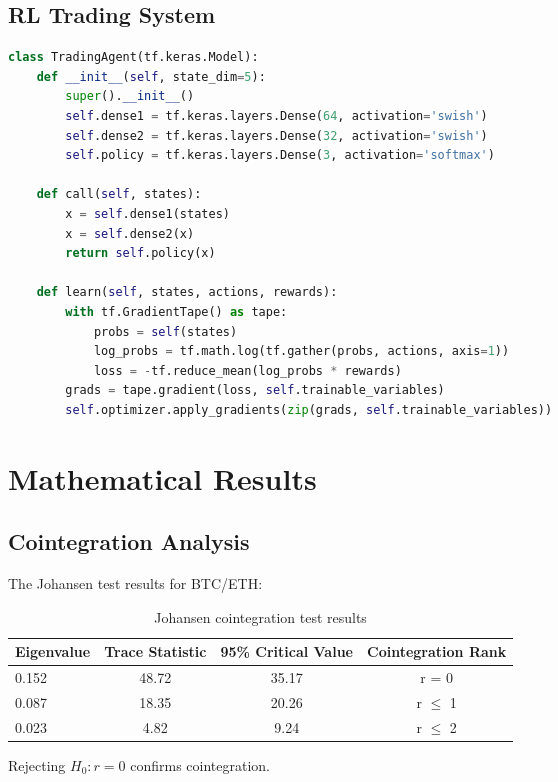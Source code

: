 \documentclass[12pt]{article}
\begin{document}
\subsection{RL Trading System}
\begin{lstlisting}[language=Python, basicstyle=\small\ttfamily]
class TradingAgent(tf.keras.Model):
    def __init__(self, state_dim=5):
        super().__init__()
        self.dense1 = tf.keras.layers.Dense(64, activation='swish')
        self.dense2 = tf.keras.layers.Dense(32, activation='swish')
        self.policy = tf.keras.layers.Dense(3, activation='softmax')
        
    def call(self, states):
        x = self.dense1(states)
        x = self.dense2(x)
        return self.policy(x)
    
    def learn(self, states, actions, rewards):
        with tf.GradientTape() as tape:
            probs = self(states)
            log_probs = tf.math.log(tf.gather(probs, actions, axis=1))
            loss = -tf.reduce_mean(log_probs * rewards)
        grads = tape.gradient(loss, self.trainable_variables)
        self.optimizer.apply_gradients(zip(grads, self.trainable_variables))
\end{lstlisting}

\section{Mathematical Results}

\subsection{Cointegration Analysis}

The Johansen test results for BTC/ETH:

\begin{table}[h]
\centering
\begin{tabular}{lccc}
\toprule
Eigenvalue & Trace Statistic & 95\% Critical Value & Cointegration Rank \\
\midrule
0.152 & 48.72 & 35.17 & r = 0 \\
0.087 & 18.35 & 20.26 & r $\leq$ 1 \\
0.023 & 4.82 & 9.24 & r $\leq$ 2 \\
\bottomrule
\end{tabular}
\caption{Johansen cointegration test results}
\end{table}

Rejecting $H_0: r=0$ confirms cointegration.
\end{document}
